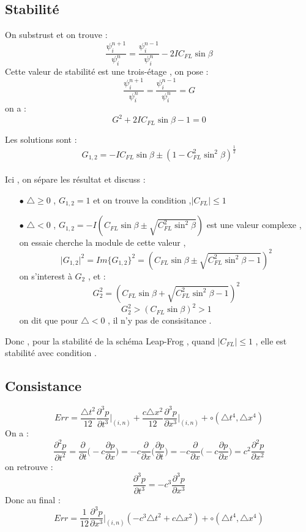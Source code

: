\documentclass[a4paper,10pt]{report} %
\begin{document}
\subsection{Stabilité}
On substrust et on trouve :
\begin{equation}
\frac{\psi^{n+1}_{i}}{\psi^{n}_{i}}=\frac{\psi^{n-1}_{i}}{\psi^{n}_{i}}-2IC_{FL}\sin\beta
\end{equation}
Cette valeur de stabilité est une trois-étage ,  on pose :
$$\frac{\psi^{n+1}_{i}}{\psi^{n}_{i}}=\frac{\psi^{n-1}_{i}}{\psi^{n}_{i}}=G$$
on a :
\begin{equation}
G^2+2IC_{FL}\sin\beta-1=0
\end{equation}

Les solutions sont :
$$G_{1,2}=-IC_{FL}\sin\beta\pm(1-C_{FL}^2\sin^2\beta)^{\frac{1}{2}}$$
\\

Ici , on sépare les résultat et discuss :
\begin{itemize}
    \item[$\bullet$]$\triangle\geq 0$  , $G_{1,2}=1$ et on trouve la condition ,$\Big|C_{FL}\Big|\leq 1 $ 
     \item[$\bullet$]$\triangle <0$ , $G_{1,2}=-I(C_{FL}\sin\beta\pm\sqrt{C_{FL}^2\sin^2\beta})$ est une valeur complexe , on essaie cherche la module de cette valeur , 
     $$\Big|G_{1,2}\Big|^2=Im\{G_{1,2}\}^2=(C_{FL}\sin\beta\pm\sqrt{C_{FL}^2\sin^2\beta-1})^2$$
     on s'interest à $G_2$ , et :
     $$G_2^2=(C_{FL}\sin\beta+\sqrt{C_{FL}^2\sin^2\beta-1})^2$$
     $$G_2^2>(C_{FL}\sin\beta)^2>1$$
   on dit que pour $\triangle <0$ , il n'y pas de consisitance .
\end{itemize}

Donc , pour la stabilité de la schéma Leap-Frog , quand $\Big|C_{FL}\Big|\leq 1$ , elle est stabilité avec condition .
\subsection{Consistance }
\begin{equation}
Err=\frac{\triangle t^2}{12}\frac{\partial^3 p}{\partial t^3}\Big|_{(i,n)}+\frac{c\triangle x^2}{12}\frac{\partial^3 p}{\partial x^3}\Big|_{(i,n)}+\circ(\triangle t^4,\triangle x^4)
\end{equation}
On a :
$$\frac{\partial^2 p}{\partial t^2}=\frac{\partial }{\partial t}\Big(-c\frac{\partial p}{\partial x}\Big)=-c\frac{\partial }{\partial x}\Big(\frac{\partial p}{\partial t}\Big)=-c\frac{\partial }{\partial x}\Big(-c\frac{\partial p}{\partial x}\Big)=c^2\frac{\partial^2 p}{\partial x^2}$$
on retrouve :
$$\frac{\partial^3 p}{\partial t^3}=-c^3\frac{\partial^3 p}{\partial x^3}$$
 Donc au final :
 \begin{equation}
 Err=\frac{1}{12}\frac{\partial^3 p}{\partial x^3}\Big|_{(i,n)}(-c^3\triangle t^2+c\triangle x^2)+\circ(\triangle t^4,\triangle x^4)
 \end{equation}
 
\end{document}
